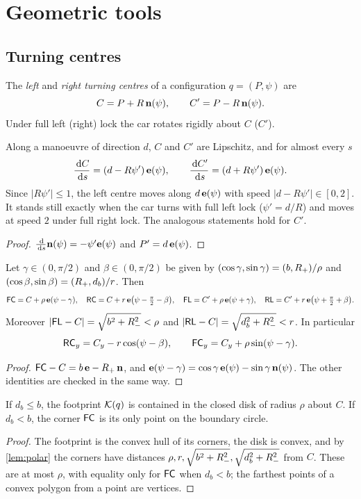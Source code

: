 \section{Geometric tools}\label{sec:toolkit}

\subsection{Turning centres}
The \emph{left} and \emph{right turning centres} of a configuration $q=(P,\psi)$ are
\[
  C=P+R\,\mathbf{n}(\psi),\qquad C'=P-R\,\mathbf{n}(\psi).
\]
Under full left (right) lock the car rotates rigidly about $C$ ($C'$).

\begin{lemma}\label{lem:drift}
Along a manoeuvre of direction $d$, $C$ and $C'$ are Lipschitz, and for almost every $s$
\[
  \frac{\,\mathrm{d} C}{\,\mathrm{d} s}=(d-R\psi')\,\mathbf{e}(\psi),\qquad \frac{\,\mathrm{d} C'}{\,\mathrm{d} s}=(d+R\psi')\,\mathbf{e}(\psi).
\]
Since $|R\psi'|\le1$, the left centre moves along $d\,\mathbf{e}(\psi)$ with speed $|d-R\psi'|\in[0,2]$.
It stands still exactly when the car turns with full left lock ($\psi'=d/R$) and moves at speed $2$ under full right lock.
The analogous statements hold for $C'$.
\end{lemma}
\begin{proof}
$\frac{\,\mathrm{d}}{\,\mathrm{d} s}\mathbf{n}(\psi)=-\psi'\mathbf{e}(\psi)$ and $P'=d\,\mathbf{e}(\psi)$.
\end{proof}

\begin{lemma}\label{lem:polar}
Let $\gamma\in(0,\pi/2)$ and $\beta\in(0,\pi/2)$ be given by $(\cos\gamma,\sin\gamma)=(b,R_{+})/\rho$ and $(\cos\beta,\sin\beta)=(R_{+},d_b)/r$.
Then
\[
  \mathsf{FC}=C+\rho\,\mathbf{e}(\psi-\gamma),\quad \mathsf{RC}=C+r\,\mathbf{e}\big(\psi-\tfrac\pi2-\beta\big),\quad
  \mathsf{FL}=C'+\rho\,\mathbf{e}(\psi+\gamma),\quad \mathsf{RL}=C'+r\,\mathbf{e}\big(\psi+\tfrac\pi2+\beta\big).
\]
Moreover $|\mathsf{FL}-C|=\sqrt{b^2+R_{-}^2}<\rho$ and $|\mathsf{RL}-C|=\sqrt{d_b^2+R_{-}^2}<r$.
In particular
\begin{equation}\label{eq:RCy}
  \mathsf{RC}_y=C_y-r\cos(\psi-\beta),\qquad \mathsf{FC}_y=C_y+\rho\sin(\psi-\gamma).
\end{equation}
\end{lemma}
\begin{proof}
$\mathsf{FC}-C=b\,\mathbf{e}-R_{+}\,\mathbf{n}$, and $\mathbf{e}(\psi-\gamma)=\cos\gamma\,\mathbf{e}(\psi)-\sin\gamma\,\mathbf{n}(\psi)$.
The other identities are checked in the same way.
\end{proof}

\begin{lemma}\label{lem:disk}
If $d_b\le b$, the footprint $\mathcal{K}(q)$ is contained in the closed disk of radius $\rho$ about $C$.
If $d_b<b$, the corner $\mathsf{FC}$ is its only point on the boundary circle.
\end{lemma}
\begin{proof}
The footprint is the convex hull of its corners, the disk is convex, and by \cref{lem:polar} the corners have distances $\rho,r,\sqrt{b^2+R_{-}^2},\sqrt{d_b^2+R_{-}^2}$ from $C$.
These are at most $\rho$, with equality only for $\mathsf{FC}$ when $d_b<b$; the farthest points of a convex polygon from a point are vertices.
\end{proof}

